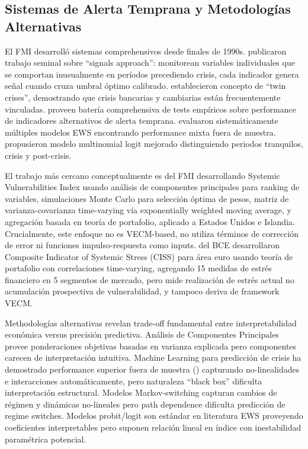 \documentclass[3p,11pt,draft,natbib=false]{elsarticle}
\begin{document}
\subsection{Sistemas de Alerta Temprana y Metodologías Alternativas}

El FMI desarrolló sistemas comprehensivos desde finales de 1990s. \citet{kaminsky1998leading} publicaron trabajo seminal sobre ``signals approach'': monitorean variables individuales que se comportan inusualmente en períodos precediendo crisis, cada indicador genera señal cuando cruza umbral óptimo calibrado. \citet{kaminsky1999twin} establecieron concepto de ``twin crises'', demostrando que crisis bancarias y cambiarias están frecuentemente vinculadas. \citet{goldstein2000assessing} proveen batería comprehensiva de tests empíricos sobre performance de indicadores alternativos de alerta temprana. \citet{berg2004assessing} evaluaron sistemáticamente múltiples modelos EWS encontrando performance mixta fuera de muestra. \citet{bussiere2006towards} propusieron modelo multinomial logit mejorado distinguiendo periodos tranquilos, crisis y post-crisis.

El trabajo más cercano conceptualmente es \citet{ayvazyan2025financial} del FMI desarrollando Systemic Vulnerabilities Index usando análisis de componentes principales para ranking de variables, simulaciones Monte Carlo para selección óptima de pesos, matriz de varianza-covarianza time-varying vía exponentially weighted moving average, y agregación basada en teoría de portafolio, aplicado a Estados Unidos e Islandia. Crucialmente, este enfoque no es VECM-based, no utiliza términos de corrección de error ni funciones impulso-respuesta como inputs. \citet{hollo2012ciss} del BCE desarrollaron Composite Indicator of Systemic Stress (CISS) para área euro usando teoría de portafolio con correlaciones time-varying, agregando 15 medidas de estrés financiero en 5 segmentos de mercado, pero mide realización de estrés actual no acumulación prospectiva de vulnerabilidad, y tampoco deriva de framework VECM.

Methodologías alternativas revelan trade-off fundamental entre interpretabilidad económica versus precisión predictiva. Análisis de Componentes Principales provee ponderaciones objetivas basadas en varianza explicada pero componentes carecen de interpretación intuitiva. Machine Learning para predicción de crisis ha demostrado performance superior fuera de muestra (\citet{buckmann2023credit,reimann2024machine}) capturando no-linealidades e interacciones automáticamente, pero naturaleza ``black box'' dificulta interpretación estructural. Modelos Markov-switching capturan cambios de régimen y dinámicas no-lineales pero path dependence dificulta predicción de regime switches. Modelos probit/logit son estándar en literatura EWS proveyendo coeficientes interpretables pero suponen relación lineal en índice con inestabilidad paramétrica potencial.
\end{document}
